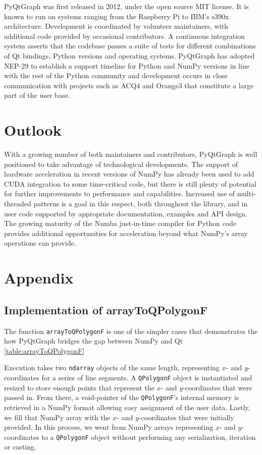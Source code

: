 PyQtGraph was first released in 2012, under the open source MIT license. It is known to run on systems ranging from the Raspberry Pi to IBM's s390x architecture. Development is coordinated by volunteer maintainers, with additional code provided by occasional contributors. A continuous integration system asserts that the codebase passes a suite of tests for different combinations of Qt bindings, Python versions and operating systems. PyQtGraph has adopted NEP-29\cite{NEP-29} to establish a support timeline for Python and NumPy versions in line with the rest of the Python community and development occurs in close communication with projects such as ACQ4\cite{10.3389/fninf.2014.00003} and Orange3\cite{JMLR:demsar13a} that constitute a large part of the user base.

\section{Outlook}
With a growing number of both maintainers and contributors, PyQtGraph is well positioned to take advantage of technological developments. The support of hardware acceleration in recent versions of NumPy has already been used to add CUDA integration to some time-critical code, but there is still plenty of potential for further improvements to performance and capabilities. Increased use of multi-threaded patterns is a goal in this respect, both throughout the library, and in user code supported by appropriate documentation, examples and API design. The growing maturity of the Numba just-in-time compiler \cite{lam2015numba} for Python code provides additional opportunities for acceleration beyond what NumPy's array operations can provide.


\section{Appendix}

\subsection{Implementation of arrayToQPolygonF}
\label{app_qpolygon}
The function \texttt{arrayToQPolygonF} is one of the simpler cases that demonstrates the how PyQtGraph bridges the gap between NumPy and Qt  \autoref{table:arrayToQPolygonF}

Execution takes two \texttt{ndarray} objects of the same length, representing $x$- and $y$-coordinates for a series of line segments. A \texttt{QPolygonF} object is instantiated and resized to store enough points that represent the $x$- and $y$-coordinates that were passed in. From there, a void-pointer of the \texttt{QPolygonF}'s internal memory is retrieved in a NumPy format allowing easy assignment of the user data. Lastly, we fill that NumPy array with the $x$- and $y$-coordinates that were initially provided.  In this process, we went from NumPy arrays representing $x$- and $y$- coordinates to a \texttt{QPolygonF} object without performing any serialization, iteration or casting.

